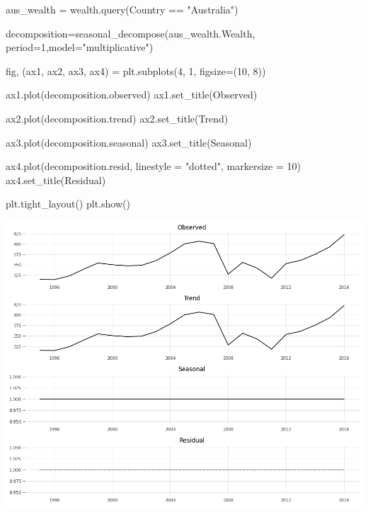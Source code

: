 \documentclass[
  11pt,
]{article}
\newenvironment{Shaded}{\begin{snugshade}}{\end{snugshade}}
\newcommand{\DecValTok}[1]{\textcolor[rgb]{0.68,0.00,0.00}{#1}}
\newcommand{\NormalTok}[1]{\textcolor[rgb]{0.00,0.23,0.31}{#1}}
\newcommand{\OperatorTok}[1]{\textcolor[rgb]{0.37,0.37,0.37}{#1}}
\newcommand{\StringTok}[1]{\textcolor[rgb]{0.13,0.47,0.30}{#1}}
\begin{document}
\begin{Shaded}
\begin{Highlighting}[]
\NormalTok{aus\_wealth }\OperatorTok{=}\NormalTok{ wealth.query(}\StringTok{\textquotesingle{}Country == "Australia"\textquotesingle{}}\NormalTok{)}
\end{Highlighting}
\end{Shaded}

\begin{Shaded}
\begin{Highlighting}[]
\NormalTok{decomposition}\OperatorTok{=}\NormalTok{seasonal\_decompose(aus\_wealth.Wealth, period}\OperatorTok{=}\DecValTok{1}\NormalTok{,model}\OperatorTok{=}\StringTok{"multiplicative"}\NormalTok{)}

\NormalTok{fig, (ax1, ax2, ax3, ax4) }\OperatorTok{=}\NormalTok{ plt.subplots(}\DecValTok{4}\NormalTok{, }\DecValTok{1}\NormalTok{, figsize}\OperatorTok{=}\NormalTok{(}\DecValTok{10}\NormalTok{, }\DecValTok{8}\NormalTok{))}

\NormalTok{ax1.plot(decomposition.observed)}
\NormalTok{ax1.set\_title(}\StringTok{\textquotesingle{}Observed\textquotesingle{}}\NormalTok{)}

\NormalTok{ax2.plot(decomposition.trend)}
\NormalTok{ax2.set\_title(}\StringTok{\textquotesingle{}Trend\textquotesingle{}}\NormalTok{)}

\NormalTok{ax3.plot(decomposition.seasonal)}
\NormalTok{ax3.set\_title(}\StringTok{\textquotesingle{}Seasonal\textquotesingle{}}\NormalTok{)}

\NormalTok{ax4.plot(decomposition.resid, linestyle }\OperatorTok{=} \StringTok{"dotted"}\NormalTok{, markersize }\OperatorTok{=} \DecValTok{10}\NormalTok{)}
\NormalTok{ax4.set\_title(}\StringTok{\textquotesingle{}Residual\textquotesingle{}}\NormalTok{)}

\NormalTok{plt.tight\_layout()}
\NormalTok{plt.show()}
\end{Highlighting}
\end{Shaded}

\includegraphics{hw3_files/figure-pdf/cell-23-output-1.png}
\end{document}
